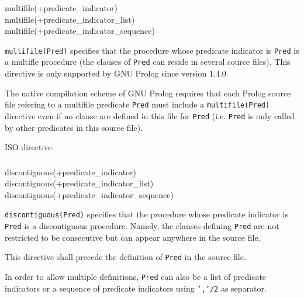 \subsubsection{}

\begin{TemplatesOneCol}
multifile(+predicate\_indicator)\\
multifile(+predicate\_indicator\_list)\\
multifile(+predicate\_indicator\_sequence)

\end{TemplatesOneCol}

\Description

\texttt{multifile(Pred)} specifies that the procedure whose predicate
indicator is \texttt{Pred} is a multifle procedure (the clauses of
\texttt{Pred} can reside in several source files). This directive is only
supported by GNU Prolog since version 1.4.0.

The native compilation scheme of GNU Prolog requires that each Prolog source
file refering to a multifile predicate \texttt{Pred} must include a
\texttt{multifile(Pred)} directive even if no clause are defined in this file
for \texttt{Pred} (i.e. \texttt{Pred} is only called by other predicates in
this source file).

\Portability

ISO directive.

\subsubsection{}

\begin{TemplatesOneCol}
discontiguous(+predicate\_indicator)\\
discontiguous(+predicate\_indicator\_list)\\
discontiguous(+predicate\_indicator\_sequence)

\end{TemplatesOneCol}

\Description

\texttt{discontiguous(Pred)} specifies that the procedure whose predicate
indicator is \texttt{Pred} is a discontiguous procedure. Namely, the clauses
defining \texttt{Pred} are not restricted to be consecutive but can appear
anywhere in the source file.

This directive shall precede the definition of \texttt{Pred} in the source
file.

In order to allow multiple definitions, \texttt{Pred} can also be a list of
predicate indicators or a sequence of predicate indicators using
\texttt{','/2} as separator.

